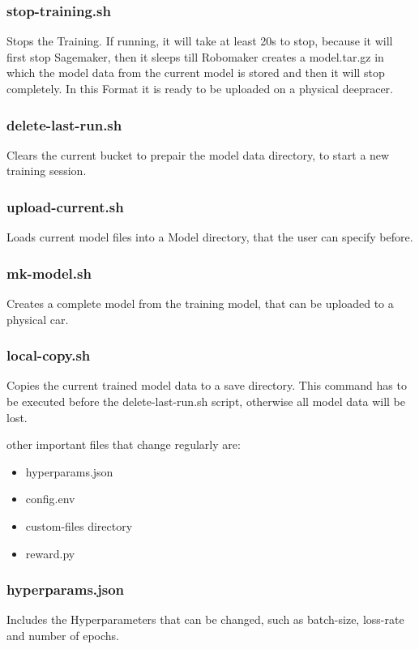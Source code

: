 \subsubsection{stop-training.sh}
Stops the Training. If running, it will take at least 20s to stop, because it will first stop Sagemaker, then it sleeps till Robomaker creates a model.tar.gz in which the model data from the current model is stored and then it will stop completely. In this Format it is ready to be uploaded on a physical deepracer.

\subsubsection{delete-last-run.sh}
Clears the current bucket to prepair the model data directory, to start a new training session.

\subsubsection{upload-current.sh}
Loads current model files into a Model directory, that the user can specify before.

\subsubsection{mk-model.sh}
Creates a complete model from the training model, that can be uploaded to a physical car.

\subsubsection{local-copy.sh}
Copies the current trained model data to a save directory. This command has to be executed before the delete-last-run.sh script, otherwise all model data will be lost.

other important files that change regularly are:

\begin{itemize}
    \item hyperparams.json
    \item config.env
    \item custom-files directory
    \item reward.py
\end{itemize}

\subsubsection{hyperparams.json}
Includes the Hyperparameters that can be changed, such as batch-size, loss-rate and number of epochs.

